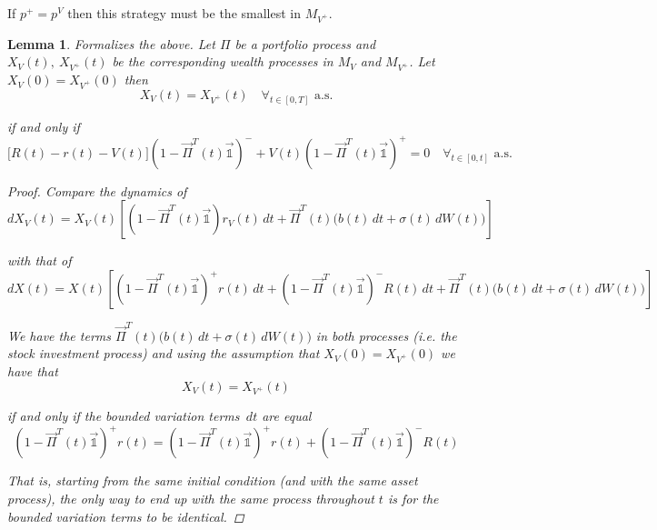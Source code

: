 \documentclass[12pt]{article}
\newtheorem{lemma}{Lemma}
\newlength\tindent
\renewcommand{\indent}{\hspace*{\tindent}}
\begin{document}
If $p^+ = p^V$ then this strategy must be the smallest in $M_{V^+}$.

\begin{lemma} {\em Formalizes the above}. Let $\Pi$ be a portfolio process and $X_V(t),~X_{V^+}(t)$ be the corresponding wealth processes in $M_V$ and $M_{V^+}$. Let $X_V(0) = X_{V^+}(0)$ then
\begin{equation*}
	X_V(t) = X_{V^+}(t) \quad \forall_{t\in[0,T]}\text{ a.s.}
\end{equation*}

if and only if
\begin{equation*}
	\big[R(t) - r(t) - V(t)\big]\left( 1 - \vec{\Pi}^T(t) \mathds {\vec{1}} \right)^- + V(t)\left( 1 - \vec{\Pi}^T(t) \mathds {\vec{1}} \right)^+ = 0 \quad \forall_{t\in[0,t]} \text{ a.s.}
\end{equation*}

\begin{proof} Compare the dynamics of
\begin{equation*}
	dX_V(t) = X_V(t) \left[ \left( 1 - \vec{\Pi}^T(t)\mathds {\vec{1}} \right) r_V(t)\,dt + \vec{\Pi}^T(t) \Big( b(t)\,dt + \sigma(t)\,dW(t) \Big) \right]
\end{equation*}

with that of
\begin{equation*}
	dX(t) = X(t) \left[ \left(  1 - \vec{\Pi}^T(t) \mathds{\vec{1}} \right)^+ r(t)\,dt + \left(  1 - \vec{\Pi}^T(t) \mathds{\vec{1}} \right)^- R(t)\,dt + \vec{\Pi}^T(t) \Big( b(t)\,dt + \sigma(t)\,dW(t) \Big) \right]
\end{equation*}

We have the terms $\vec{\Pi}^T(t) \Big( b(t)\,dt + \sigma(t)\,dW(t) \Big)$ in both processes (i.e. the stock investment process) and using the assumption that $X_V(0) = X_{V^+}(0)$ we have that
\begin{equation*}
	X_V(t) = X_{V^+}(t)
\end{equation*} 

if and only if the bounded variation terms $\,dt$ are equal
\begin{equation*}
	\left(  1 - \vec{\Pi}^T(t) \mathds{\vec{1}} \right)^+ r(t) =  \left(  1 - \vec{\Pi}^T(t) \mathds{\vec{1}} \right)^+ r(t) + \left(  1 - \vec{\Pi}^T(t) \mathds{\vec{1}} \right)^- R(t)
\end{equation*}

\indent That is, starting from the same initial condition (and with the same asset process), the only way to end up with the same process throughout $t$ is for the bounded variation terms to be identical.

\end{proof}
\end{lemma}
\end{document}
